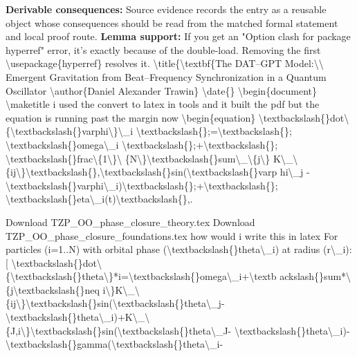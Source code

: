 \textbf{Derivable consequences:} Source evidence records the entry as a reusable object whose consequences should be read from the matched formal statement and local proof route.
\textbf{Lemma support:} If you get an "Option clash for package hyperref" error, it's exactly because of the double-load. Removing the first \textbackslash{}usepackage\{hyperref\} resolves it. \textbackslash{}title\{\textbackslash{}textbf\{The DAT--GPT Model:\textbackslash{}\textbackslash{} Emergent Gravitation from Beat--Frequency Synchronization in a Quantum Oscillator \textbackslash{}author\{Daniel Alexander Trawin\} \textbackslash{}date\{\} \textbackslash{}begin\{document\} \textbackslash{}maketitle i used the convert to latex in tools and it built the pdf but the equation is running past the margin now \textbackslash{}begin\{equation\} \textbackslash{}textbackslash\{\}dot\textbackslash{}\{\textbackslash{}textbackslash\{\}varphi\textbackslash{}\}\textbackslash{}\_i \textbackslash{}textbackslash\{\};=\textbackslash{}textbackslash\{\}; \textbackslash{}textbackslash\{\}omega\textbackslash{}\_i \textbackslash{}textbackslash\{\};+\textbackslash{}textbackslash\{\}; \textbackslash{}textbackslash\{\}frac\textbackslash{}\{1\textbackslash{}\}\textbackslash{} \{N\textbackslash{}\}\textbackslash{}textbackslash\{\}sum\textbackslash{}\_\textbackslash{}\{j\textbackslash{}\} K\textbackslash{}\_\textbackslash{} \{ij\textbackslash{}\}\textbackslash{}textbackslash\{\},\textbackslash{}textbackslash\{\}sin(\textbackslash{}textbackslash\{\}varp hi\textbackslash{}\_j - \textbackslash{}textbackslash\{\}varphi\textbackslash{}\_i)\textbackslash{}textbackslash\{\};+\textbackslash{}textbackslash\{\}; \textbackslash{}textbackslash\{\}eta\textbackslash{}\_i(t)\textbackslash{}textbackslash\{\},.\par
\endgroup

Download TZP\_OO\_phase\_closure\_theory.tex Download TZP\_OO\_phase\_closure\_foundations.tex how would i write this in latex For particles (i=1..N) with orbital phase (\textbackslash{}textbackslash\{\}theta\textbackslash{}\_i) at radius (r\textbackslash{}\_i): [ \textbackslash{}textbackslash\{\}dot\textbackslash{} \{\textbackslash{}textbackslash\{\}theta\textbackslash{}\}*i=\textbackslash{}textbackslash\{\}omega\textbackslash{}\_i+\textbackslash{}textb ackslash\{\}sum*\textbackslash{}\{j\textbackslash{}textbackslash\{\}neq i\textbackslash{}\}K\textbackslash{}\_\textbackslash{} \{ij\textbackslash{}\}\textbackslash{}textbackslash\{\}sin(\textbackslash{}textbackslash\{\}theta\textbackslash{}\_j- \textbackslash{}textbackslash\{\}theta\textbackslash{}\_i)+K\textbackslash{}\_\textbackslash{} \{J,i\textbackslash{}\}\textbackslash{}textbackslash\{\}sin(\textbackslash{}textbackslash\{\}theta\textbackslash{}\_J- \textbackslash{}textbackslash\{\}theta\textbackslash{}\_i)- \textbackslash{}textbackslash\{\}gamma(\textbackslash{}textbackslash\{\}theta\textbackslash{}\_i-

